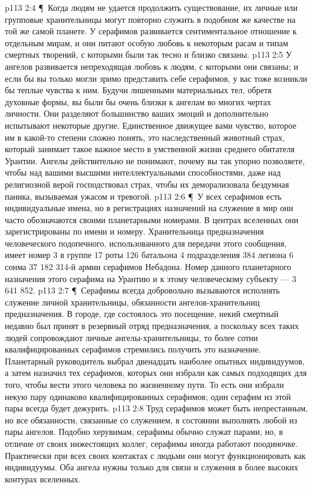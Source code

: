 \vs p113 2:4 \P\ Когда людям не удается продолжить существование, их личные или групповые хранительницы могут повторно служить в подобном же качестве на той же самой планете. У серафимов развивается сентиментальное отношение к отдельным мирам, и они питают особую любовь к некоторым расам и типам смертных творений, с которыми были так тесно и близко связаны.
\vs p113 2:5 У ангелов развивается непреходящая любовь к людям, с которыми они связаны; и если бы вы только могли зримо представить себе серафимов, у вас тоже возникли бы теплые чувства к ним. Будучи лишенными материальных тел, обретя духовные формы, вы были бы очень близки к ангелам во многих чертах личности. Они разделяют большинство ваших эмоций и дополнительно испытывают некоторые другие. Единственное движущее вами чувство, которое им в какой\hyp{}то степени сложно понять, это наследственный животный страх, который занимает такое важное место в умственной жизни среднего обитателя Урантии. Ангелы действительно не понимают, почему вы так упорно позволяете, чтобы над вашими высшими интеллектуальными способностями, даже над религиозной верой господствовал страх, чтобы их деморализовала бездумная паника, вызываемая ужасом и тревогой.
\vs p113 2:6 \P\ У всех серафимов есть индивидуальные имена, но в регистрациях назначений на служение в мир они часто обозначаются своими планетарными номерами. В центрах вселенных они зарегистрированы по имени и номеру. Хранительница предназначения человеческого подопечного, использованного для передачи этого сообщения, имеет номер 3 в группе 17 роты 126 батальона 4 подразделения 384 легиона 6 сонма 37 182 314\hyp{}й армии серафимов Небадона. Номер данного планетарного назначения этого серафима на Урантию и к этому человеческому субъекту --- 3 641 852.
\vs p113 2:7 \P\ Серафимы всегда добровольно вызываются исполнять служение личной хранительницы, обязанности ангелов\hyp{}хранительниц предназначения. В городе, где состоялось это посещение, некий смертный недавно был принят в резервный отряд предназначения, а поскольку всех таких людей сопровождают личные ангелы\hyp{}хранительницы, то более сотни квалифицированных серафимов стремились получить это назначение. Планетарный руководитель выбрал двенадцать наиболее опытных индивидуумов, а затем назначил тех серафимов, которых они избрали как самых подходящих для того, чтобы вести этого человека по жизненному пути. То есть они избрали некую пару одинаково квалифицированных серафимов; один серафим из этой пары всегда будет дежурить.
\vs p113 2:8 Труд серафимов может быть непрестанным, но все обязанности, связанные со служением, в состоянии выполнять любой из пары ангелов. Подобно херувимам, серафимы обычно служат парами, но, в отличие от своих нижестоящих коллег, серафимы иногда работают поодиночке. Практически при всех своих контактах с людьми они могут функционировать как индивидуумы. Оба ангела нужны только для связи и служения в более высоких контурах вселенных.
